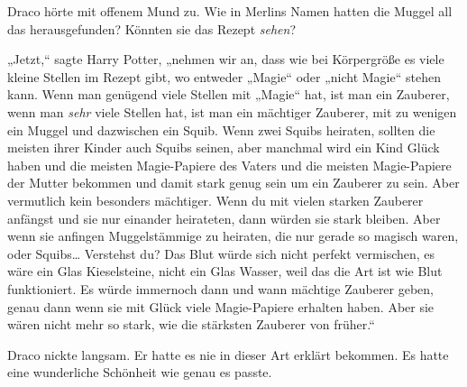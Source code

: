{Draco hörte mit offenem Mund zu. Wie in Merlins Namen hatten die Muggel all das herausgefunden? Könnten sie das Rezept \emph{sehen}?

„Jetzt,“ sagte Harry Potter, „nehmen wir an, dass wie bei Körpergröße es viele kleine Stellen im Rezept gibt, wo entweder „Magie“ oder „nicht Magie“ stehen kann. Wenn man genügend viele Stellen mit „Magie“ hat, ist man ein Zauberer, wenn man \emph{sehr} viele Stellen hat, ist man ein mächtiger Zauberer, mit zu wenigen ein Muggel und dazwischen ein Squib. Wenn zwei Squibs heiraten, sollten die meisten ihrer Kinder auch Squibs seinen, aber manchmal wird ein Kind Glück haben und die meisten Magie-Papiere des Vaters und die meisten Magie-Papiere der Mutter bekommen und damit stark genug sein um ein Zauberer zu sein. Aber vermutlich kein besonders mächtiger. Wenn du mit vielen starken Zauberer anfängst und sie nur einander heirateten, dann würden sie stark bleiben. Aber wenn sie anfingen Muggelstämmige zu heiraten, die nur gerade so magisch waren, oder Squibs… Verstehst du? Das Blut würde sich nicht perfekt vermischen, es wäre ein Glas Kieselsteine, nicht ein Glas Wasser, weil das die Art ist wie Blut funktioniert. Es würde immernoch dann und wann mächtige Zauberer geben, genau dann wenn sie mit Glück viele Magie-Papiere erhalten haben. Aber sie wären nicht mehr so stark, wie die stärksten Zauberer von früher.“

Draco nickte langsam. Er hatte es nie in dieser Art erklärt bekommen. Es hatte eine wunderliche Schönheit wie genau es passte.

}

